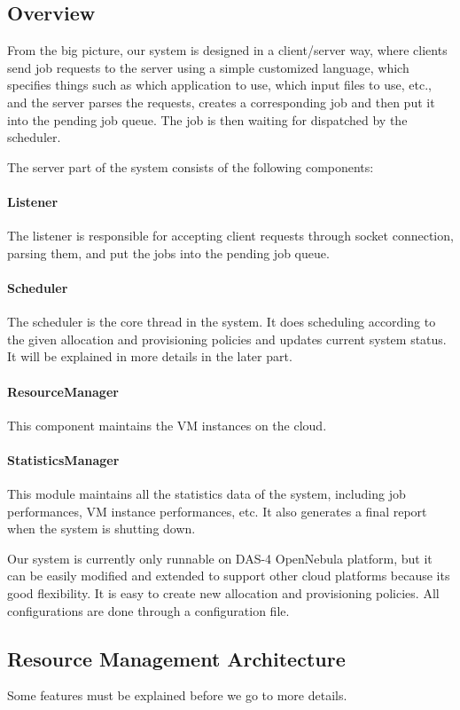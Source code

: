 \subsection{Overview}
From the big picture, our system is designed in a client/server way, where clients send job requests to the server using a simple customized language, which specifies things such as which application to use, which input files to use, etc., and the server parses the requests, creates a corresponding job and then put it into the pending job queue. The job is then waiting for dispatched by the scheduler.

The server part of the system consists of the following components:

\paragraph{Listener} The listener is responsible for accepting client requests through socket connection, parsing them, and put the jobs into the pending job queue.
\paragraph{Scheduler} The scheduler is the core thread in the system. It does scheduling according to the given allocation and provisioning policies and updates current system status. It will be explained in more details in the later part.
\paragraph{ResourceManager} This component maintains the VM instances on the cloud.
\paragraph{StatisticsManager} This module maintains all the statistics data of the system, including job performances, VM instance performances, etc. It also generates a final report when the system is shutting down.

Our system is currently only runnable on DAS-4 OpenNebula platform, but it can be easily modified and extended to support other cloud platforms because its good flexibility. It is easy to create new allocation and provisioning policies. All configurations are done through a configuration file.


\subsection{Resource Management Architecture}
Some features must be explained before we go to more details.

